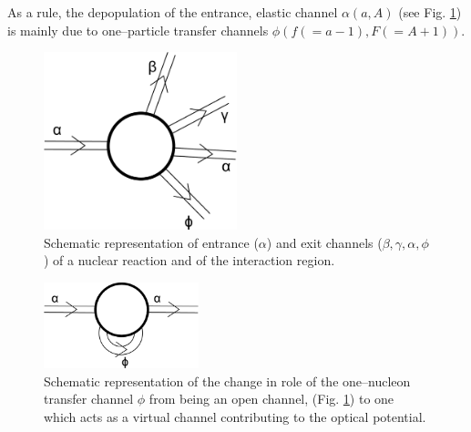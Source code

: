 As a rule, the depopulation of the entrance, elastic channel $\alpha (a,A)$ (see Fig. \ref{fig_2}) is mainly due to one--particle transfer channels $\phi (f(=a-1),F(=A+1))$.
\begin{figure}
\centerline{\includegraphics*[width=0.5\textwidth,angle=0]{nutshell/figs/fig_2.pdf}}
\caption{Schematic representation of entrance ($\alpha$) and exit channels ($\beta,\gamma,\alpha,\phi$)  of a nuclear reaction and of the interaction region.}\label{fig_2}
\end{figure}
\begin{figure}
\centerline{\includegraphics*[width=0.4\textwidth,angle=0]{nutshell/figs/fig_3.pdf}}
\caption{Schematic representation of the change in role of the one--nucleon transfer channel $\phi$ from being an open channel, (Fig. \ref{fig_2}) to one which acts as a virtual channel contributing to the optical potential.}\label{fig_3}
\end{figure}
